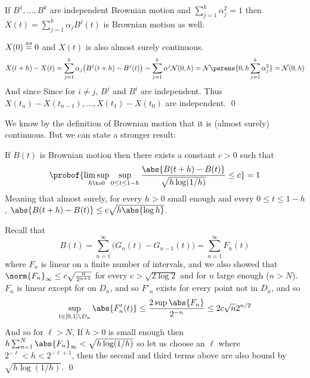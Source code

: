 \bprop[title=Superposition of Brownian Motion, name=superpos]

    If $B^1,\dots,B^k$ are independent Brownian motion and $\sum_{j=1}^k\alpha_j^2=1$ then $X(t)=\sum_{j=1}^k\alpha_jB^j(t)$ is Brownian motion as well.

\eprop

$X(0)\buildrel as\over=0$ and $X(t)$ is also almost surely continuous.
$$ X(t+h) - X(t) = \sum_{j=1}^k\alpha_j\bigl(B^j(t+h) - B^j(t)\bigr) \sim \sum_{j=1}^k \alpha^j{\cal N}(0,h) = {\cal N}\parens{0,h\sum_{j=1}^k\alpha_j^2} = {\cal N}(0,h) $$
And since
Since for $i\neq j$, $B^j$ and $B^i$ are independent.
Thus $X(t_n)-X(t_{n-1}),\dots,X(t_1)-X(t_0)$ are independent.
\qed

We know by the definition of Brownian motion that it is (almost surely) continuous.
But we can state a stronger result:

\bthrm

    If $B(t)$ is Brownian motion then there exists a constant $c>0$ such that
    $$ \probof{\limsup_{h\to0}\sup_{0\leq t\leq1-h}\frac{\abs{B(t+h)-B(t)}}{\sqrt{h\log(1/h)}} \leq c} = 1 $$
    Meaning that almost surely, for every $h>0$ small enough and every $0\leq t\leq 1-h$, $\abs{B(t+h)-B(t)}\leq c\sqrt{h\abs{\log h}}$.

\ethrm

Recall that
$$ B(t) = \sum_{n=1}^\infty\bigl(G_n(t) - G_{n-1}(t)\bigr) = \sum_{n=1}^\infty F_n(t) $$
where $F_n$ is linear on a finite number of intervals, and we also showed that $\norm{F_n}_\infty\leq c\sqrt{\frac n{2^{n+1}}}$ for every $c>\sqrt{2\log2}$ and for $n$ large enough ($n>N$).
$F_n$ is linear except for on $D_n$, and so $F'_n$ exists for every point not in $D_n$, and so
$$ \sup_{t\in[0,1]\setminus D_n}\abs{F_n'(t)} \leq \frac{2\sup\abs{F_n}}{2^{-n}} \leq 2c\sqrt n2^{n/2} $$
And so for $\ell>N$,
If $h>0$ is small enough then $h\sum_{n=1}^N\abs{F_n}_\infty<\sqrt{h\log(1/h)}$ so let us choose an $\ell$ where $2^{-\ell}<h<2^{-\ell+1}$, then the second and third terms above are also bound by
$\sqrt{h\log(1/h)}$.
\qed

